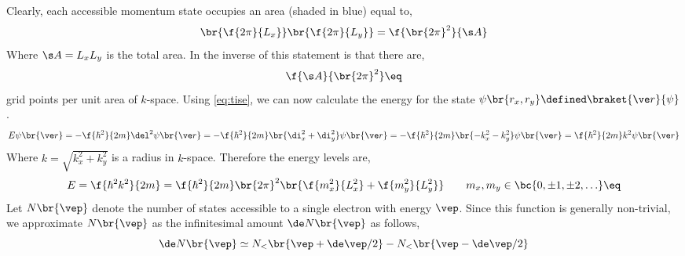 \documentclass{article}
\begin{document}
\begin{center}
\end{center}
Clearly, each accessible momentum state occupies an area (shaded in blue) equal to,
\[ \br{\f{2\pi}{L_x}}\br{\f{2\pi}{L_y}} = \f{\br{2 \pi}^2}{\s A} \]
Where $\s A = L_x L_y$ is the total area. In the inverse of this statement is that there are,
\[ \f{\s A}{\br{2\pi}^2} \eq \label{eq:area}\]
grid points per unit area of $k$-space. Using \cref{eq:tise}, we can now calculate the energy for the state $\psi\br{r_x, r_y} \defined \braket{\ve r}{\psi}$.
\[ E \psi \br{\ve r} = -\f{\hbar^2}{2m} \del^2 \psi\br{\ve r} = -\f{\hbar^2}{2m} \br{\di_x^2 + \di_y^2} \psi\br{\ve r} = -\f{\hbar^2}{2m} \br{-k_x^2 -k_y^2} \psi\br{\ve r} = \f{\hbar^2}{2m} k^2 \psi\br{\ve r}\]
Where $k = \sqrt{k_x^2 + k_y^2}$ is a radius in $k$-space. Therefore the energy levels are,
\[ E = \f{\hbar^2 k^2}{2m} = \f{\hbar^2}{2m}\br{2\pi}^2 \br{\f{m_x^2}{L_x^2} + \f{m_y^2}{L_y^2}} \qquad m_x, m_y \in \bc{0, \pm1, \pm2, \ldots} \eq \label{eq:energy_levels}\]
Let $N\br{\vep}$ denote the number of states accessible to a single electron with energy $\vep$. Since this function is generally non-trivial, we approximate $N\br{\vep}$ as the infinitesimal amount $\de N\br{\vep}$ as follows,
\[ \de N\br{\vep} \simeq N_{<} \br{\vep + \de \vep/2} - N_{<} \br{\vep - \de \vep/2} \]
\end{document}
